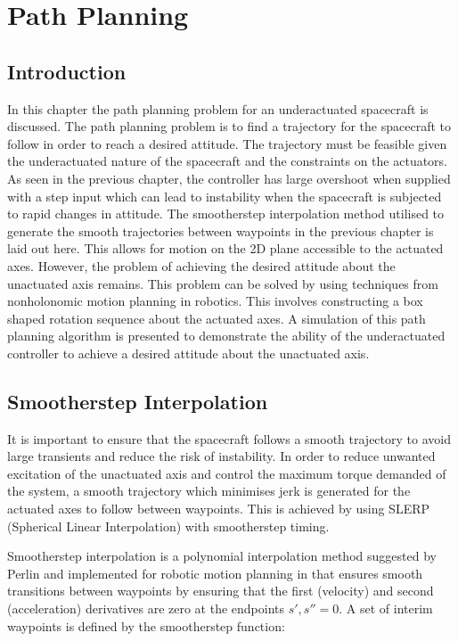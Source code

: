 \chapter{Path Planning}
\label{chap:path_planning}

\section{Introduction}
In this chapter the path planning problem for an underactuated spacecraft is discussed. The path planning problem is to find a trajectory for the spacecraft to follow in order to reach a desired attitude. The trajectory must be feasible given the underactuated nature of the spacecraft and the constraints on the actuators. As seen in the previous chapter, the controller has large overshoot when supplied with a step input which can lead to instability when the spacecraft is subjected to rapid changes in attitude. The smootherstep interpolation method utilised to generate the smooth trajectories between waypoints in the previous chapter is laid out here. This allows for motion on the 2D plane accessible to the actuated axes. However, the problem of achieving the desired attitude about the unactuated axis remains. This problem can be solved by using techniques from nonholonomic motion planning in robotics. This involves constructing a box shaped rotation sequence about the actuated axes. A simulation of this path planning algorithm is presented to demonstrate the ability of the underactuated controller to achieve a desired attitude about the unactuated axis.

\section{Smootherstep Interpolation}
It is important to ensure that the spacecraft follows a smooth trajectory to avoid large transients and reduce the risk of instability. In order to reduce unwanted excitation of the unactuated axis and control the maximum torque demanded of the system, a smooth trajectory which minimises jerk \cite{lynch2017modern} is generated for the actuated axes to follow between waypoints. This is achieved by using SLERP (Spherical Linear Interpolation) with smootherstep timing. 

Smootherstep interpolation is a polynomial interpolation method suggested by Perlin \cite{ebert1998texturing} and implemented for robotic motion planning in \cite{lynch2017modern} that ensures smooth transitions between waypoints by ensuring that the first (velocity) and second (acceleration) derivatives are zero at the endpoints $s', s'' = 0$. A set of interim waypoints is defined by the smootherstep function:

